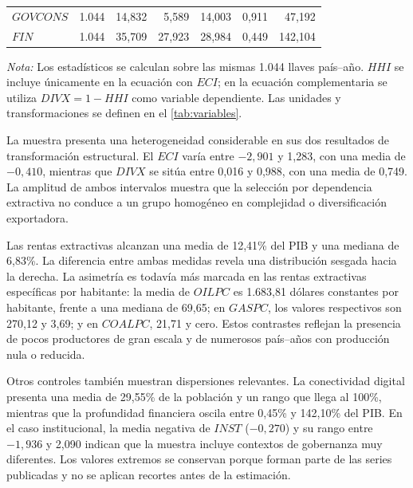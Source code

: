 \documentclass[../../TFM.tex]{subfiles}
\begin{document}
\begin{table}[htbp]
\begin{tabular}{lrrrrrr}
			$GOVCONS$              & 1.044 & 14,832   & 5,589 & 14,003   & 0,911      & 47,192 \\
			$FIN$                  & 1.044 & 35,709   & 27,923 & 28,984  & 0,449      & 142,104 \\
			\bottomrule
		\end{tabular}
		\begin{minipage}{0.94\textwidth}
			\par\smallskip
			\footnotesize
			\textit{Nota:} Los estadísticos se calculan sobre las mismas 1.044
			llaves país--año. $HHI$ se incluye únicamente en la ecuación con
			$ECI$; en la ecuación complementaria se utiliza $DIVX=1-HHI$ como
			variable dependiente. Las unidades y transformaciones se definen en
			el \autoref{tab:variables}.
		\end{minipage}
	\end{table}

	La muestra presenta una heterogeneidad considerable en sus dos resultados de
	transformación estructural. El $ECI$ varía entre $-2,901$ y 1,283, con una
	media de $-0,410$, mientras que $DIVX$ se sitúa entre 0,016 y 0,988, con una
	media de 0,749. La amplitud de ambos intervalos muestra que la selección por
	dependencia extractiva no conduce a un grupo homogéneo en complejidad o
	diversificación exportadora.

	Las rentas extractivas alcanzan una media de 12,41\% del PIB y una mediana de
	6,83\%. La diferencia entre ambas medidas revela una distribución sesgada
	hacia la derecha. La asimetría es todavía más marcada en las rentas
	extractivas específicas por habitante: la media de $OILPC$ es 1.683,81
	dólares constantes por habitante,
	frente a una mediana de 69,65; en $GASPC$, los valores respectivos son 270,12
	y 3,69; y en $COALPC$, 21,71 y cero. Estos contrastes reflejan la presencia de
	pocos productores de gran escala y de numerosos país--años con producción
	nula o reducida.

	Otros controles también muestran dispersiones relevantes. La conectividad
	digital presenta una media de 29,55\% de la población y un rango que llega al
	100\%, mientras que la profundidad financiera oscila entre 0,45\% y
	142,10\% del PIB. En el caso institucional, la media negativa de $INST$
	($-0,270$) y su rango entre $-1,936$ y 2,090 indican que la muestra incluye
	contextos de gobernanza muy diferentes. Los valores extremos se conservan
	porque forman parte de las series publicadas y no se aplican recortes antes
	de la estimación.
\end{document}
